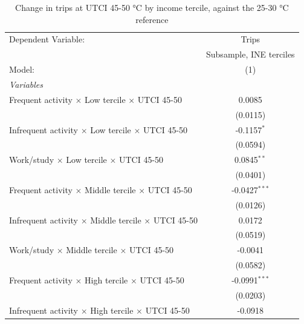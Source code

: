 
\begin{table}[htbp]
   \caption{\label{table_model_d_45-50} Change in trips at UTCI 45-50 °C by income tercile, against the 25-30 °C reference}
   \centering
   \small
   \begin{tabular}{lc}
      \tabularnewline \midrule \midrule
      Dependent Variable:                                               & Trips\\  
                                                                        & Subsample, INE terciles \\   
      Model:                                                            & (1)\\  
      \midrule
      \emph{Variables}\\
      Frequent activity $\times$ Low tercile $\times$ UTCI 45-50        & 0.0085\\   
                                                                        & (0.0115)\\   
      Infrequent activity $\times$ Low tercile $\times$ UTCI 45-50      & -0.1157$^{*}$\\   
                                                                        & (0.0594)\\   
      Work/study $\times$ Low tercile $\times$ UTCI 45-50               & 0.0845$^{**}$\\   
                                                                        & (0.0401)\\   
      Frequent activity $\times$ Middle tercile $\times$ UTCI 45-50     & -0.0427$^{***}$\\   
                                                                        & (0.0126)\\   
      Infrequent activity $\times$ Middle tercile $\times$ UTCI 45-50   & 0.0172\\   
                                                                        & (0.0519)\\   
      Work/study $\times$ Middle tercile $\times$ UTCI 45-50            & -0.0041\\   
                                                                        & (0.0582)\\   
      Frequent activity $\times$ High tercile $\times$ UTCI 45-50       & -0.0991$^{***}$\\   
                                                                        & (0.0203)\\   
      Infrequent activity $\times$ High tercile $\times$ UTCI 45-50     & -0.0918\\   

\end{tabular}
\end{table}
